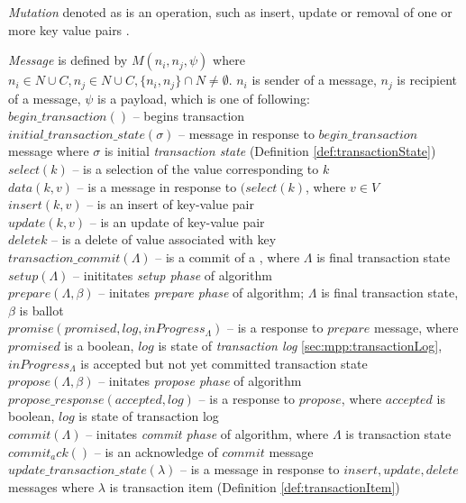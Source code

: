 \begin{definition}
  \label{def:mutation}
  \emph{Mutation} denoted as  is an operation, such as insert, update or removal of one or more key value pairs \kv.
\end{definition}

\begin{definition}
	\label{def:message}
	\emph{Message} is defined by $\mathit{M}(n_{i}, n_{j}, \psi)$ where $n_{i}\in\mathit{N}\cup\mathit{C}, n_{j}\in\mathit{N}\cup\mathit{C},\{n_{i}, n_{j}\}\cap\mathit{N}\neq\emptyset$.
	$n_{i}$ is sender of a message, $n_{j}$ is recipient of a message, $\psi$ is a payload, which is one of following: \\	
	$\mathit{begin\_transaction}()$ -- begins transaction \transaction \\
	$\mathit{initial\_transaction\_state(\sigma)}$ -- message in response to $\mathit{begin\_transaction}$ message where $\sigma$ is initial \emph{transaction state} (Definition \ref{def:transactionState}) \\
	$\mathit{select(k)}$ -- is a selection of the value corresponding to $k$ \\
	$\mathit{data(k,v)}$ -- is a message in response to $\mathit(select(k)$, where $v\in\mathit{V}$ \\
	$\mathit{insert(k,v)}$ -- is an insert of key-value pair \\
	$\mathit{update(k,v)}$ -- is an update of key-value pair \\
	$\mathit{delete{k}}$ -- is a delete of value associated with key \\
	$\mathit{transaction\_commit(\Lambda)}$ -- is a commit of a \transaction, where $\Lambda$ is final transaction state \\
	$\mathit{setup(\Lambda)}$ -- inititates \emph{setup phase} of \mpt algorithm \\
	$\mathit{prepare(\Lambda, \beta)}$ -- initates \emph{prepare phase} of \mpt algorithm; $\Lambda$ is final transaction state, $\beta$ is \paxos ballot \\
	$\mathit{promise(promised, log, inProgress_{\Lambda})}$ -- is a response to $\mathit{prepare}$ message, where $\mathit{promised}$ is a boolean, $\mathit{log}$ is state of \emph{transaction log} \ref{sec:mpp:transactionLog}, $\mathit{inProgress_{\Lambda}}$ is accepted but not yet committed transaction state \\
	$\mathit{propose(\Lambda, \beta)}$ -- initates \emph{propose phase} of \mpt algorithm
	$\mathit{propose\_response(accepted, log)}$ -- is a response to $\mathit{propose}$, where $\mathit{accepted}$ is boolean, $\mathit{log}$ is state of transaction log \\
	$\mathit{commit(\Lambda)}$ -- initates \emph{commit phase} of \mpt algorithm, where $\Lambda$ is transaction state \\
	$\mathit{commit_ack()}$ -- is an acknowledge of $\mathit{commit}$ message \\
	$\mathit{update\_transaction\_state(\lambda)}$ -- is a message in response to $\mathit{insert, update, delete}$ messages where $\lambda$ is transaction item (Definition \ref{def:transactionItem}) 
\end{definition}


